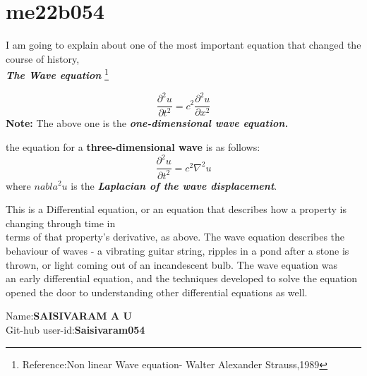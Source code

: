 \documentclass{article}
\begin{document}
\section{me22b054}
I am going to explain about one of the most important equation that changed the course of history, \\ \textbf{\textit{The Wave equation}} \footnote{Reference:Non linear Wave equation- Walter Alexander Strauss,1989}

\begin{equation}
\frac{\partial^2 u}{\partial t^2} = c^2 \frac{\partial^2 u}{\partial x^2}
\end{equation}
 \textbf{Note:} The above one is the \textbf{\textit{one-dimensional wave equation.}}
 
 the equation for a \textbf{three-dimensional wave } is as follows:
 \begin{equation}
 \frac{\partial^2 u}{\partial t^2} = c^2 \nabla^2 u
 \end{equation}
  where \textbf{$nabla^2 u$} is the \textbf{\textit{Laplacian of the wave displacement}}.
  
  
 This is a Differential equation, or an equation that describes how a property is changing through time in \\ terms of that property's  derivative, as above. The wave equation describes the \\ behaviour  of waves - a vibrating guitar string, ripples in a pond after a stone is \\ thrown,  or light coming out of an incandescent bulb. The wave equation was \\ an  early differential equation, and the techniques developed to solve the equation \\ opened the door to understanding other differential equations as well.\par
 
 
 Name:\textbf{SAISIVARAM A U} \\
 Git-hub user-id:\textbf{Saisivaram054}
 
\end{document}
